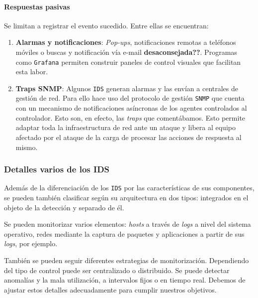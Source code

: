 \documentclass[12pt]{article}
\newcommand{\newpar} {
    \vskip 0.5cm
}
\begin{document}
                \paragraph{Respuestas pasivas}
                    Se limitan a registrar el evento sucedido. Entre ellas se encuentran:

                    \begin{enumerate}
                        \item \textbf{Alarmas y notificaciones}: \textit{Pop-ups}, notificaciones remotas a teléfonos móviles o buscas y notificación vía e-mail \textbf{desaconsejada??}. Programas como \texttt{Grafana} permiten construir paneles de control visuales que facilitan esta labor.
                        \item \textbf{Traps SNMP}: Algunos \texttt{IDS} generan alarmas y las envían a centrales de gestión de red. Para ello hace uso del protocolo de gestión \texttt{SNMP} que cuenta con un mecanismo de notificaciones asíncronas de los agentes controlados al controlador. Esto son, en efecto, las \textit{traps} que comentábamos. Esto permite adaptar toda la infraestructura de red ante un ataque y libera al equipo afectado por el ataque de la carga de procesar las acciones de respuesta al mismo.
                    \end{enumerate}

            \subsubsection{Detalles varios de los IDS}
                Además de la diferenciación de los \texttt{IDS} por las características de sus componentes, se pueden también clasificar según su arquitectura en dos tipos: integrados en el objeto de la detección y separado de él.

                \newpar

                Se pueden monitorizar varios elementos: \textit{hosts} a través de \textit{logs} a nivel del sistema operativo, redes mediante la captura de paquetes y aplicaciones a partir de sus \textit{logs}, por ejemplo.

                \newpar

                También se pueden seguir diferentes estrategias de monitorización. Dependiendo del tipo de control puede ser centralizado o distribuido. Se puede detectar anomalías y la mala utilización, a intervalos fijos o en tiempo real. Debemos de ajustar estos detalles adecuadamente para cumplir nuestros objetivos.
\end{document}
